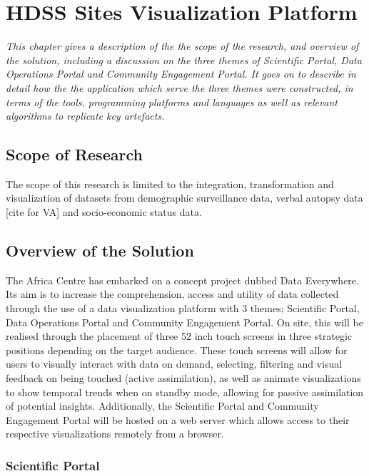 \chapter{HDSS Sites Visualization Platform }
\label{methods}

\textit{This chapter gives a description of the the scope of the research, and overview of the solution, including a discussion on the three themes of Scientific Portal, Data Operations Portal and Community Engagement Portal. It goes on to describe in detail how the the application which serve the three themes were constructed, in terms of the tools, programming platforms and languages as well as relevant algorithms to replicate key artefacts.}
\vspace{2ex}\vfill
\minitoc
\newpage

\section{Scope of Research}\label{scope}

The scope of this research is limited to the integration, transformation and visualization of datasets from demographic surveillance data, verbal autopsy data [cite for VA] and socio-economic status data. 

\section{Overview of the Solution}\label{scope}
The Africa Centre has embarked on a concept project dubbed Data Everywhere.  Its aim is to increase the comprehension, access and utility of data collected through the use of a data visualization platform with 3 themes; Scientific Portal, Data Operations Portal and Community Engagement Portal. On site, this will be realised through the placement of three 52 inch touch screens in three strategic positions depending on the target audience. These touch screens will allow for users to visually interact with data on demand, selecting, filtering and visual feedback on being touched (active assimilation), as well as animate visualizations to show temporal trends when on standby mode, allowing for passive assimilation of potential insights. Additionally, the Scientific Portal and Community Engagement Portal will be hosted on a web server which allows access to their respective visualizations remotely from a browser.

\subsection{Scientific Portal}

